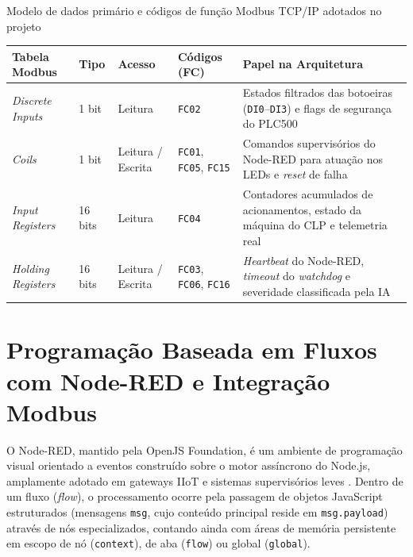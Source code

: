 \begin{quadro}[htb]
  \centering
  \SingleSpacing
  \caption{Modelo de dados primário e códigos de função Modbus TCP/IP adotados no projeto}
  \label{quadro:modbus_modelo}
  \footnotesize
  \begin{tabularx}{\textwidth}{|p{2.9cm}|p{1.6cm}|p{1.7cm}|p{2.3cm}|L|}
    \hline
    \textbf{Tabela Modbus} & \textbf{Tipo} & \textbf{Acesso} & \textbf{Códigos (FC)} & \textbf{Papel na Arquitetura} \\
    \hline
    \textit{Discrete Inputs} & 1 bit & Leitura & \texttt{FC02} & Estados filtrados das botoeiras (\texttt{DI0}--\texttt{DI3}) e flags de segurança do PLC500 \\
    \hline
    \textit{Coils} & 1 bit & Leitura / Escrita & \texttt{FC01}, \texttt{FC05}, \texttt{FC15} & Comandos supervisórios do Node-RED para atuação nos LEDs e \textit{reset} de falha \\
    \hline
    \textit{Input Registers} & 16 bits & Leitura & \texttt{FC04} & Contadores acumulados de acionamentos, estado da máquina do CLP e telemetria real \\
    \hline
    \textit{Holding Registers} & 16 bits & Leitura / Escrita & \texttt{FC03}, \texttt{FC06}, \texttt{FC16} & \textit{Heartbeat} do Node-RED, \textit{timeout} do \textit{watchdog} e severidade classificada pela IA \\
    \hline
  \end{tabularx}
\end{quadro}

\section{Programação Baseada em Fluxos com Node-RED e Integração Modbus}
\label{sec:fund_nodered}

O Node-RED, mantido pela OpenJS Foundation, é um ambiente de programação visual orientado a eventos construído sobre o motor assíncrono do Node.js, amplamente adotado em gateways IIoT e sistemas supervisórios leves \cite{nodered_docs}. Dentro de um fluxo (\textit{flow}), o processamento ocorre pela passagem de objetos JavaScript estruturados (mensagens \texttt{msg}, cujo conteúdo principal reside em \texttt{msg.payload}) através de nós especializados, contando ainda com áreas de memória persistente em escopo de nó (\texttt{context}), de aba (\texttt{flow}) ou global (\texttt{global}).

